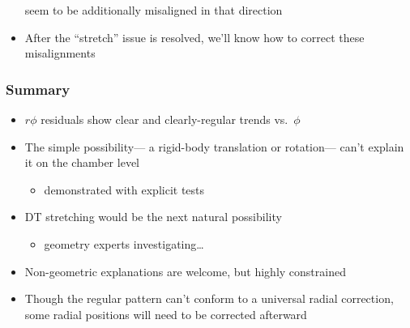 \documentclass[compress]{beamer}
\begin{document}
\begin{frame}
\begin{itemize}
seem to be additionally misaligned in that direction
\item After the ``stretch'' issue is resolved, we'll know how to correct these misalignments
\end{itemize}
\end{frame}

\begin{frame}
\frametitle{Summary}
\begin{itemize}
\item $r\phi$ residuals show clear and clearly-regular trends vs.\ $\phi$
\item The simple possibility--- a rigid-body translation or
  rotation--- can't explain it on the chamber level
\begin{itemize}
\item demonstrated with explicit tests
\end{itemize}

\item DT stretching would be the next natural possibility
\begin{itemize}
\item geometry experts investigating\ldots
\end{itemize}

\item Non-geometric explanations are welcome, but highly constrained

\item Though the regular pattern can't conform to a universal radial correction,
  some radial positions will need to be corrected afterward
\end{itemize}
\label{numpages}
\end{frame}
\end{document}
